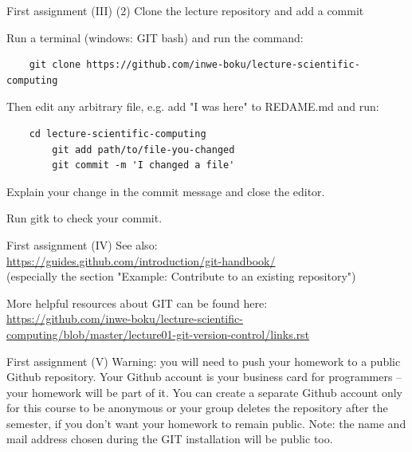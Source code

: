 \begin{frame}[fragile]{First assignment (III)}
	(2) Clone the lecture repository and add a commit

	Run a terminal (windows: GIT bash) and run the command:

    {\small
        \begin{verbatim}
    git clone https://github.com/inwe-boku/lecture-scientific-computing
        \end{verbatim}
    }

	Then edit any arbitrary file, e.g. add "I was here" to REDAME.md and run:

	\begin{verbatim}
    cd lecture-scientific-computing
	    git add path/to/file-you-changed
	    git commit -m 'I changed a file'
	\end{verbatim}

	Explain your change in the commit message and close the editor.

	Run gitk to check your commit.

\end{frame}

\begin{frame}[fragile]{First assignment (IV)}
	See also:\\
	\href{https://guides.github.com/introduction/git-handbook/}{https://guides.github.com/introduction/git-handbook/}\\
	(especially the section "Example: Contribute to an existing repository")
    \bigskip

	More helpful resources about GIT can be found here:\\
	\href{https://github.com/inwe-boku/lecture-scientific-computing/blob/master/lecture01-git-version-control/links.rst}
	{https://github.com/inwe-boku/lecture-scientific-computing/blob/master/lecture01-git-version-control/links.rst}
\end{frame}

\begin{frame}{First assignment (V)}
    Warning: you will need to push your homework to a public Github repository. Your Github account
    is your business card for programmers -- your homework will be part of it. You can create a
    separate Github account only for this course to be anonymous or your group deletes the
    repository after the semester, if you don't want your homework to remain public. Note: the name
    and mail address chosen during the GIT installation will be public too.
\end{frame}


